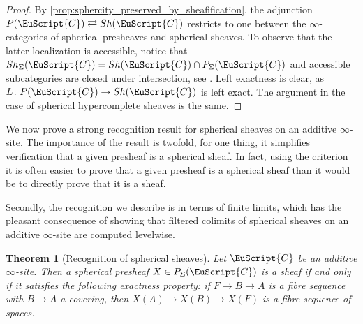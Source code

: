 \documentclass[oneside,a4paper]{amsart}
\newcommand{\euscr}[1]{\EuScript{#1}} %
\newcommand{\ccat}{\euscr{C}} %
\theoremstyle{plain}
\newtheorem{thm}{Theorem}[section]
\theoremstyle{definition}
\theoremstyle{remark}
\begin{document}
\begin{proof}
By \cref{prop:sphercity_preserved_by_sheafification}, the adjunction $P(\ccat) \rightleftarrows Sh(\ccat)$ restricts to one between the $\infty$-categories of spherical presheaves and spherical sheaves. To observe that the latter localization is accessible, notice that $Sh_{\Sigma}(\ccat) = Sh(\ccat) \cap P_{\Sigma}(\ccat)$ and accessible subcategories are closed under intersection, see \cite[5.4.7.10, 5.5.1.2]{lurie_higher_topos_theory}. Left exactness is clear, as $L \colon P(\ccat) \rightarrow Sh(\ccat)$ is left exact. The argument in the case of spherical hypercomplete sheaves is the same. 
\end{proof}



We now prove a strong recognition result for spherical sheaves on an additive $\infty$-site. The importance of the result is twofold, for one thing, it simplifies verification that a given presheaf is a spherical sheaf. In fact, using the criterion it is often easier to prove that a given presheaf is a spherical sheaf than it would be to directly prove that it is a sheaf.

Secondly, the recognition we describe is in terms of finite limits, which has the pleasant consequence of showing that filtered colimits of spherical sheaves on an additive $\infty$-site are computed levelwise. 

\begin{thm}[Recognition of spherical sheaves]
\label{thm:recognition_of_spherical_sheaves}
Let $\ccat$ be an additive $\infty$-site. Then a spherical presheaf $X \in P_{\Sigma}(\ccat)$ is a sheaf if and only if it satisfies the following exactness property: if $F \rightarrow B \rightarrow A$ is a fibre sequence with $B \rightarrow A$ a covering, then $X(A) \rightarrow X(B) \rightarrow X(F)$ is a fibre sequence of spaces.
\end{thm}
\end{document}

